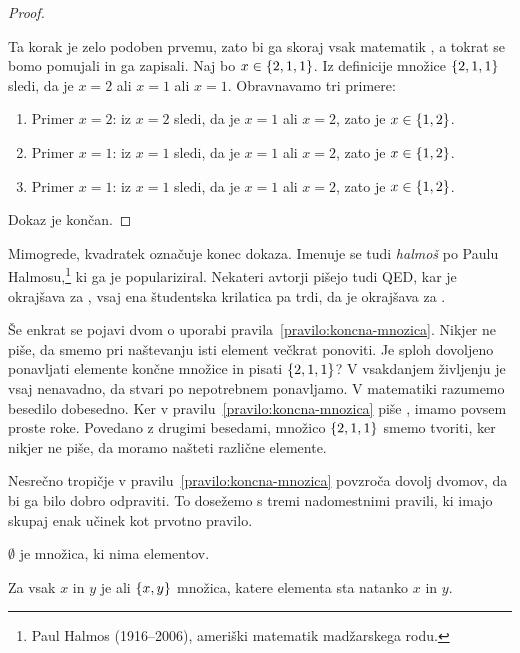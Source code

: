 \begin{proof}
\begin{enumerate}
    Ta korak je zelo podoben prvemu, zato bi ga skoraj vsak matematik ,
    a tokrat se bomo pomujali in ga zapisali.
    Naj bo $x \in \left\{2, 1, 1\right\}$. Iz definicije množice $\left\{2, 1, 1\right\}$ sledi, da je $x = 2$ ali
    $x = 1$ ali $x = 1$. Obravnavamo tri primere:
    \begin{enumerate}
    \item Primer $x = 2$: iz $x = 2$ sledi, da je $x = 1$ ali $x = 2$, zato je $x \in \left\{1, 2\right\}$.
    \item Primer $x = 1$: iz $x = 1$ sledi, da je $x = 1$ ali $x = 2$, zato je $x \in \left\{1, 2\right\}$.
    \item Primer $x = 1$: iz $x = 1$ sledi, da je $x = 1$ ali $x = 2$, zato je $x \in \left\{1, 2\right\}$.
    \end{enumerate}
  \end{enumerate}
  Dokaz je končan.
\end{proof}

Mimogrede, kvadratek označuje konec dokaza. Imenuje se tudi \emph{halmoš} po
Paulu Halmosu,\footnote{Paul Halmos (1916--2006), ameriški matematik madžarskega rodu.} ki ga je populariziral. Nekateri avtorji pišejo tudi QED, kar je okrajšava za , vsaj ena študentska krilatica pa trdi, da je okrajšava za .

Še enkrat se pojavi dvom o uporabi pravila~\ref{pravilo:koncna-mnozica}. Nikjer ne piše, da smemo pri naštevanju isti element večkrat ponoviti. Je sploh dovoljeno ponavljati elemente končne množice in pisati $\left\{2, 1, 1\right\}$?
%
V vsakdanjem življenju je vsaj nenavadno, da stvari po nepotrebnem ponavljamo.
%
V matematiki razumemo besedilo dobesedno. Ker v pravilu~\ref{pravilo:koncna-mnozica} piše , imamo povsem proste roke. Povedano z drugimi besedami, množico
$\left\{2, 1, 1\right\}$ smemo tvoriti, ker nikjer ne piše, da moramo našteti različne elemente.

Nesrečno tropičje v pravilu~\ref{pravilo:koncna-mnozica} povzroča dovolj dvomov, da bi ga bilo dobro odpraviti.
To dosežemo s tremi nadomestnimi pravili, ki imajo skupaj enak učinek kot prvotno pravilo.

\begin{pravilo}
  \label{pravilo:prazna-mnozica}
   $\emptyset$ je množica, ki nima elementov.
\end{pravilo}

\begin{pravilo}
  \label{pravilo:neurejeni-dvojec}
  Za vsak $x$ in $y$ je  ali  $\left\{x, y\right\}$ množica, katere
  elementa sta natanko $x$ in $y$.
\end{pravilo}

